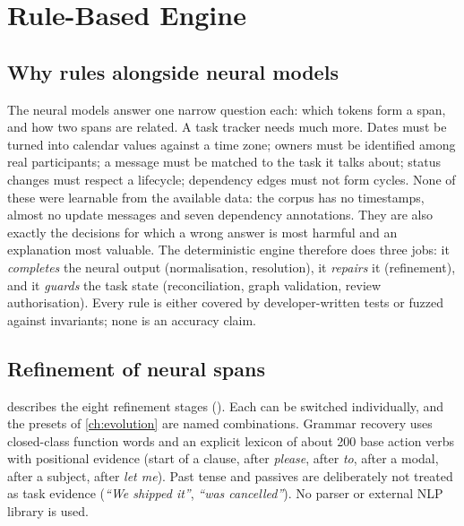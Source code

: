 \chapter{Rule-Based Engine}
\label{ch:rules}

\section{Why rules alongside neural models}
The neural models answer one narrow question each: which tokens form a span, and how two spans are related. A task tracker needs much more. Dates must be turned into calendar values against a time zone; owners must be identified among real participants; a message must be matched to the task it talks about; status changes must respect a lifecycle; dependency edges must not form cycles. None of these were learnable from the available data: the corpus has no timestamps, almost no update messages and seven dependency annotations. They are also exactly the decisions for which a wrong answer is most harmful and an explanation most valuable. The deterministic engine therefore does three jobs: it \emph{completes} the neural output (normalisation, resolution), it \emph{repairs} it (refinement), and it \emph{guards} the task state (reconciliation, graph validation, review authorisation). Every rule is either covered by developer-written tests or fuzzed against invariants; none is an accuracy claim.

\section{Refinement of neural spans}
\label{sec:refinement}
 describes the eight refinement stages (). Each can be switched individually, and the presets of \cref{ch:evolution} are named combinations. Grammar recovery uses closed-class function words and an explicit lexicon of about 200 base action verbs with positional evidence (start of a clause, after \emph{please}, after \emph{to}, after a modal, after a subject, after \emph{let me}). Past tense and passives are deliberately not treated as task evidence (\emph{``We shipped it''}, \emph{``was cancelled''}). No parser or external NLP library is used.

